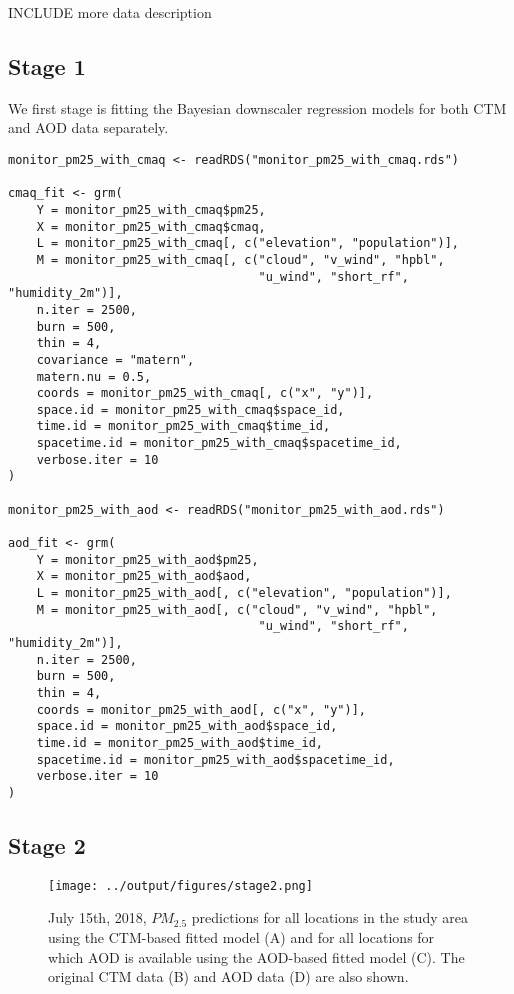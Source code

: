 INCLUDE more data description

\subsection*{Stage 1}

We first stage is fitting the Bayesian downscaler regression models for both CTM and AOD data separately. 


\begin{lstlisting}
monitor_pm25_with_cmaq <- readRDS("monitor_pm25_with_cmaq.rds")

cmaq_fit <- grm(
    Y = monitor_pm25_with_cmaq$pm25,
    X = monitor_pm25_with_cmaq$cmaq,
    L = monitor_pm25_with_cmaq[, c("elevation", "population")],
    M = monitor_pm25_with_cmaq[, c("cloud", "v_wind", "hpbl", 
                                   "u_wind", "short_rf", "humidity_2m")],
    n.iter = 2500,
    burn = 500,
    thin = 4,
    covariance = "matern",
    matern.nu = 0.5,
    coords = monitor_pm25_with_cmaq[, c("x", "y")],
    space.id = monitor_pm25_with_cmaq$space_id,
    time.id = monitor_pm25_with_cmaq$time_id,
    spacetime.id = monitor_pm25_with_cmaq$spacetime_id,
    verbose.iter = 10
)

monitor_pm25_with_aod <- readRDS("monitor_pm25_with_aod.rds")

aod_fit <- grm(
    Y = monitor_pm25_with_aod$pm25,
    X = monitor_pm25_with_aod$aod,
    L = monitor_pm25_with_aod[, c("elevation", "population")],
    M = monitor_pm25_with_aod[, c("cloud", "v_wind", "hpbl", 
                                   "u_wind", "short_rf", "humidity_2m")],
    n.iter = 2500,
    burn = 500,
    thin = 4,
    coords = monitor_pm25_with_aod[, c("x", "y")],
    space.id = monitor_pm25_with_aod$space_id,
    time.id = monitor_pm25_with_aod$time_id,
    spacetime.id = monitor_pm25_with_aod$spacetime_id,
    verbose.iter = 10
)

\end{lstlisting}

\subsection*{Stage 2}

\begin{figure}[ht]
    \centering
    \texttt{[image: ../output/figures/stage2.png]}
    \caption{July 15th, 2018,  $PM_{2.5}$ predictions for all locations in the study area using the CTM-based fitted model (A) and for all locations for which AOD is available using the AOD-based fitted model (C). The original CTM data (B) and AOD data (D) are also shown.}
    \label{fig:stage2}
\end{figure}

